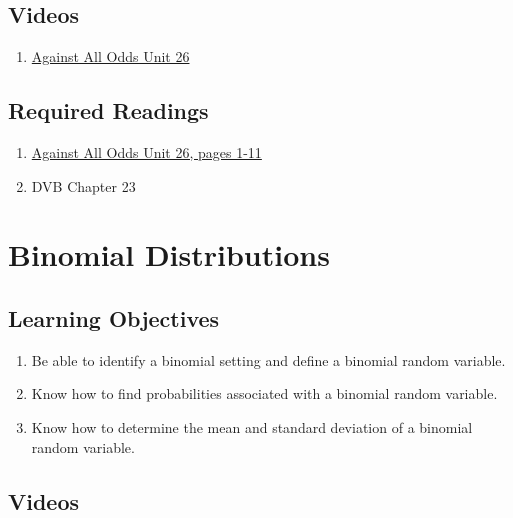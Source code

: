 \documentclass[letterpaper,10pt,twocolumn,twoside,]{pinp}
\providecommand{\tightlist}{%
  \setlength{\itemsep}{0pt}\setlength{\parskip}{0pt}}
\begin{document}
\hypertarget{videos-1}{%
\subsection{Videos}\label{videos-1}}

\begin{enumerate}
\def\labelenumi{\arabic{enumi}.}
\tightlist
\item
  \href{https://www.learner.org/series/against-all-odds-inside-statistics/small-sample-inference-for-one-mean/}{Against
  All Odds Unit 26}
\end{enumerate}

\hypertarget{required-readings-2}{%
\subsection{Required Readings}\label{required-readings-2}}

\begin{enumerate}
\item \href{https://www.learner.org/wp-content/uploads/2019/03/AgainstAllOdds_StudentGuide_Unit26-Small-Sample-Inference-for-One-Mean.pdf}{Against All Odds Unit 26, pages 1-11}
\item DVB Chapter 23
\end{enumerate}

\hypertarget{binomial-distributions}{%
\section{Binomial Distributions}\label{binomial-distributions}}

\hypertarget{learning-objectives-3}{%
\subsection{Learning Objectives}\label{learning-objectives-3}}

\begin{enumerate}
\def\labelenumi{\arabic{enumi}.}
\tightlist
\item
  Be able to identify a binomial setting and define a binomial random
  variable.
\item
  Know how to find probabilities associated with a binomial random
  variable.
\item
  Know how to determine the mean and standard deviation of a binomial
  random variable.
\end{enumerate}

\hypertarget{videos-2}{%
\subsection{Videos}\label{videos-2}}
\end{document}
